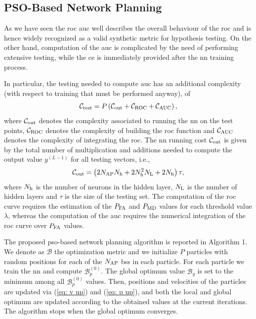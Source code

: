 \documentclass[conference,final]{IEEEtran}
\begin{document}
\subsection{PSO-Based Network Planning}

As we have seen the \ac{roc} \ac{auc} well describes the overall behaviour of the \ac{roc} and is hence widely recognized as a valid synthetic metric for hypothesis testing. On the other hand, computation of the \ac{auc} is complicated by the need of performing extensive testing, while the \ac{ce} is immediately provided after the \ac{nn} training process. 

In particular, the testing needed to compute \ac{auc} has an additional complexity (with respect to training that must be performed anyway), of 
\begin{equation}
    \mathcal{C}_{\rm test} = P \left( \mathcal{C}_{\rm out}+\mathcal{C}_{\rm ROC}+\mathcal{C}_{\rm AUC}\right),
\end{equation}
where  $\mathcal{C}_{\rm out}$ denotes the complexity associated to running the \ac{nn} on the test points, $\mathcal{C}_{\rm ROC}$ denotes the complexity of building the \ac{roc} function and $\mathcal{C}_{\rm AUC}$ denotes the complexity of integrating the \ac{roc}. The \ac{nn} running cost $\mathcal{C}_{\rm out}$ is given by the total number of multiplication and additions needed to compute the output value $y^{(L-1)}$ for all testing vectors, i.e.,
\begin{equation}
    \mathcal{C}_{\rm out} = \left(2N_{\rm AP}N_{\rm h}+2N_{\rm h}^2N_{\rm L} + 2N_{\rm h}\right)\tau ,
\end{equation}
where $N_{\rm h}$ is the number of neurons in the hidden layer, $N_{\rm L}$ is the number of hidden layers and $\tau$ is the size of the testing set.
The computation of the \ac{roc} curve requires the estimation of the $P_{\rm FA}$ and $P_{\rm MD}$ values for each threshold value $\lambda$, whereas the computation of the \ac{auc} requires the numerical integration of the \ac{roc} curve over $P_{\rm FA}$ values.

The proposed \ac{pso}-based network planning algorithm is reported in Algorithm 1. We denote as $\mathcal{B}$ the optimization metric and we initialize $P$ particles with random positions for each of the $N_{\rm AP}$ \acp{bs} in each particle. For each particle we train the \ac{nn} and compute $\mathcal{B}_p^{(0)}$. The global optimum value $\mathcal{B}_g$ is set to the minimum among all $\mathcal{B}_p^{(0)}$ values. Then, positions and velocities of the particles are updated via (\ref{eq: v up}) and (\ref{eq: p up}), and both the local and global optimum are updated according to the obtained values at the current iterations. The algorithm stops when the global optimum converges.
\end{document}
